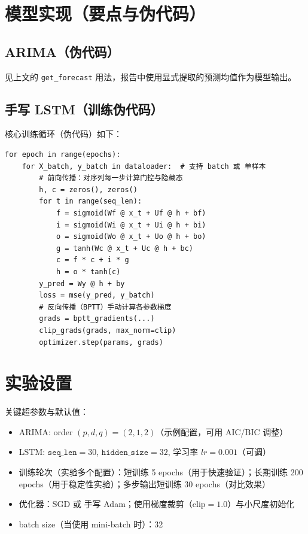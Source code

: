 \section{模型实现（要点与伪代码）}
\subsection{ARIMA（伪代码）}
见上文的 \texttt{get\_forecast} 用法，报告中使用显式提取的预测均值作为模型输出。

\subsection{手写 LSTM（训练伪代码）}
核心训练循环（伪代码）如下：
\begin{lstlisting}[style=cleanpython]
for epoch in range(epochs):
    for X_batch, y_batch in dataloader:  # 支持 batch 或 单样本
        # 前向传播：对序列每一步计算门控与隐藏态
        h, c = zeros(), zeros()
        for t in range(seq_len):
            f = sigmoid(Wf @ x_t + Uf @ h + bf)
            i = sigmoid(Wi @ x_t + Ui @ h + bi)
            o = sigmoid(Wo @ x_t + Uo @ h + bo)
            g = tanh(Wc @ x_t + Uc @ h + bc)
            c = f * c + i * g
            h = o * tanh(c)
        y_pred = Wy @ h + by
        loss = mse(y_pred, y_batch)
        # 反向传播（BPTT）手动计算各参数梯度
        grads = bptt_gradients(...)
        clip_grads(grads, max_norm=clip)
        optimizer.step(params, grads)
\end{lstlisting}


\section{实验设置}
关键超参数与默认值：
\begin{itemize}
    \item ARIMA: order $(p,d,q)=(2,1,2)$（示例配置，可用 AIC/BIC 调整）
    \item LSTM: $\texttt{seq\_len}=30$, $\texttt{hidden\_size}=32$, 学习率 $lr=0.001$（可调）
    \item 训练轮次（实验多个配置）：短训练 5 epochs（用于快速验证）；长期训练 200 epochs（用于稳定性实验）；多步输出短训练 30 epochs（对比效果）
    \item 优化器：SGD 或 手写 Adam；使用梯度裁剪（$\mathrm{clip}=1.0$）与小尺度初始化
    \item batch size（当使用 mini-batch 时）：32
\end{itemize}

